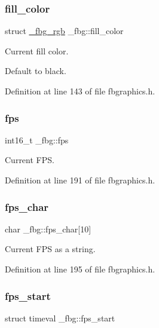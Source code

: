 \subsubsection{\texorpdfstring{fill\+\_\+color}{fill\_color}}
{\footnotesize\ttfamily struct \hyperlink{fbgraphics_8h_struct__fbg__rgb}{\+\_\+fbg\+\_\+rgb} \+\_\+fbg\+::fill\+\_\+color}



Current fill color. 

Default to black. 

Definition at line 143 of file fbgraphics.\+h.

\mbox{\label{struct__fbg_a64b16363bc48d1e19141df2e242930a9}} 
\subsubsection{\texorpdfstring{fps}{fps}}
{\footnotesize\ttfamily int16\+\_\+t \+\_\+fbg\+::fps}



Current F\+PS. 



Definition at line 191 of file fbgraphics.\+h.

\mbox{\label{struct__fbg_af447e6ed58d893989c8dad075807a79b}} 
\subsubsection{\texorpdfstring{fps\+\_\+char}{fps\_char}}
{\footnotesize\ttfamily char \+\_\+fbg\+::fps\+\_\+char\mbox{[}10\mbox{]}}



Current F\+PS as a string. 



Definition at line 195 of file fbgraphics.\+h.

\mbox{\label{struct__fbg_a07d7bb827a7595c956fe22c2d65bba33}} 
\subsubsection{\texorpdfstring{fps\+\_\+start}{fps\_start}}
{\footnotesize\ttfamily struct timeval \+\_\+fbg\+::fps\+\_\+start}



